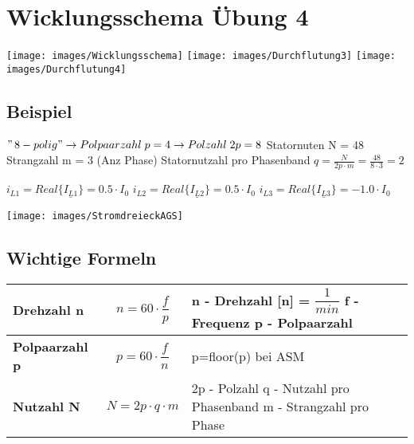 \section{Wicklungsschema Übung 4}
\begin{center}
    \texttt{[image: images/Wicklungsschema]}\newline
    \texttt{[image: images/Durchflutung3]} \newline
    \texttt{[image: images/Durchflutung4]} \newline
\end{center}
\vspace{-1cm}
\subsection{Beispiel}
    \begin{minipage}{0.5\linewidth}	
        $ "\,8-polig "  \rightarrow  Polpaarzahl \; p = 4   \rightarrow  Polzahl \;2p = 8$\newline
        Statornuten N = 48  \newline
        Strangzahl m = 3 (Anz Phase)\newline
        Statornutzahl pro Phasenband $q = \frac{N}{2p \cdot m}= \frac{48}{8 \cdot 3}=2 $\newline
    \end{minipage} 
    \begin{minipage}{0.3\linewidth}
        $i_{L1} = Real\{\underline{I_{L1}}\} = 0.5\cdot I_0$ \newline \newline
        $i_{L2} = Real\{\underline{I_{L2}}\} = 0.5\cdot I_0$ \newline \newline
        $i_{L3} = Real\{\underline{I_{L3}}\} = -1.0\cdot I_0$ 
    \end{minipage}
    \begin{minipage}{0.3\linewidth}
    \texttt{[image: images/StromdreieckAGS]}
\end{minipage}
\vspace{-1cm}
\subsection{Wichtige Formeln}
\renewcommand{\arraystretch}{0.8}
\begin{tabular}{|C{0.3\textwidth}|P{0.3\textwidth}|P{0.3\textwidth}|}
    \hline
    \textbf{Drehzahl n} &
    \[n = 60\cdot \dfrac{f}{p}\] &
    \vspace{0.1cm}\textbf{n - Drehzahl [n]} = $\dfrac{1}{min}$ \newline 
    f - Frequenz \newline
    p - Polpaarzahl 
    \\ \hline
    \textbf{Polpaarzahl p}&
    \[ p= 60\cdot \dfrac{f}{n} \]&
    p=floor(p) bei ASM
    \\ \hline 
    \textbf{Nutzahl N} &
    \[ N = 2p\cdot q\cdot m\] &
    2p - Polzahl \newline 
    q - Nutzahl pro Phasenband \newline
    m - Strangzahl pro Phase 
    \\ \hline  						 
\end{tabular}
\clearpage